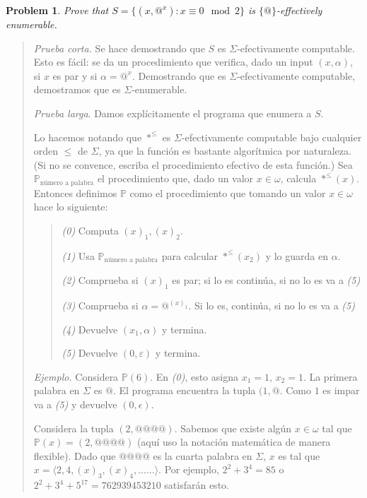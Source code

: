 \documentclass[a4paper, 12pt]{article}
\newtheorem{problem}{Problem}
\newtheorem{problem}{Problem}
\begin{document}
\begin{problem}
    Prove that $S = \{(x, @^x) : x \equiv 0 \mod 2\}$ is $\{@\}$-effectively
    enumerable.
\end{problem}


\small
\begin{quote}

\textit{Prueba corta.} Se hace demostrando que $S$ es $\Sigma$-efectivamente
computable. Esto es fácil: se da un procedimiento que verifica, dado un input
$(x, \alpha)$, si $x$ es par y si $\alpha = @^x$. Demostrando que es
$\Sigma$-efectivamente computable, demostramos que es $\Sigma$-enumerable.

\textit{Prueba larga}. Damos explícitamente el programa que enumera a $S$.

Lo hacemos notando que $*^{\leq}$ es $\Sigma$-efectivamente computable bajo
cualquier orden $\leq$ de $\Sigma$, ya que la función es bastante algorítmica por
naturaleza. (Si no se convence, escriba el procedimiento efectivo de esta
función.) Sea $\mathbb{P}_{\text{número a palabra}}$ el procedimiento que, dado
un valor $x \in \omega$, calcula $*^{\leq}(x)$. Entonces definimos $\mathbb{P}$
como el procedimiento que tomando un valor $x \in \omega$ hace lo siguiente:

\footnotesize
\begin{quote}
\textit{(0)} Computa $(x)_1, (x)_2$.

\textit{(1)} Usa $\mathbb{P}_{\text{número a palabra}}$ para calcular $*^{\leq}(x_2)$
y lo guarda en $\alpha$. 

\textit{(2)} Comprueba si $(x)_1$ es par; si lo es continúa, si no lo es va a
\textit{(5)}

\textit{(3)} Comprueba si $\alpha = @^{(x)_1}$. Si lo es, continúa, si no lo es
va a \textit{(5)} 

\textit{(4)} Devuelve $(x_1, \alpha)$ y termina. 

\textit{(5)} Devuelve $(0, \varepsilon)$ y termina.
\end{quote}
\small

\textit{Ejemplo.} Considera $\mathbb{P}(6)$. En \textit{(0)}, esto asigna $x_1 = 1$,
$x_2 = 1$.  La primera palabra en $\Sigma$ es $@$. El programa encuentra la
tupla $(1, @$. Como $1$ es impar va a \textit{(5)} y devuelve $(0, \epsilon)$.

Considera la tupla $(2, @@@@)$. Sabemos que existe algún $x \in \omega$ tal que
$\mathbb{P}(x) = (2, @@@@)$ (aquí uso la notación matemática de manera flexible). Dado que $@@@@$ es la cuarta palabra en $\Sigma$, $x$ es tal que
$x = \langle 2, 4, (x)_3, (x)_4, \ldots \ldots\rangle $. Por ejemplo, $2^2 + 3^4 =
85$ o $2^2 + 3^4 + 5^{17} = 762939453210$ satisfarán esto.

\end{quote}
\normalsize
\end{document}
